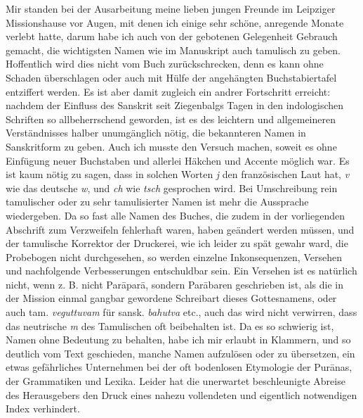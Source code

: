 \documentclass{article}
\begin{document}
Mir standen bei der Ausarbeitung meine lieben jungen Freunde im Leipziger Missionshause vor Augen, mit denen ich einige sehr schöne, anregende Monate verlebt hatte, darum habe ich auch von der gebotenen Gelegenheit Gebrauch gemacht, die wichtigsten Namen wie im Manuskript auch tamulisch zu geben. Hoffentlich wird dies nicht vom Buch zurückschrecken, denn es kann ohne Schaden überschlagen oder auch mit Hülfe der angehängten Buchstabiertafel entziffert werden. Es ist aber damit zugleich ein andrer Fortschritt erreicht: nachdem der Einfluss des Sanskrit seit Ziegenbalgs Tagen in den indologischen Schriften so allbeherrschend geworden, ist es des leichtern und allgemeineren Verständnisses halber unumgänglich nötig, die bekannteren Namen in Sanskritform zu geben. Auch ich musste den Versuch machen, soweit es ohne Einfügung neuer Buchstaben und allerlei Häkchen und Accente möglich war. Es ist kaum nötig zu sagen, dass in solchen Worten \emph{j} den französischen Laut hat, \emph{v} wie das deutsche \emph{w}, und \emph{ch} wie \emph{tsch} gesprochen wird. Bei Umschreibung rein tamulischer oder zu sehr tamulisierter Namen ist mehr die Aussprache wiedergeben. Da so fast alle Namen des Buches, die zudem in der vorliegenden Abschrift zum Verzweifeln fehlerhaft waren, haben geändert werden müssen, und der tamulische Korrektor der Druckerei, wie ich leider zu spät gewahr ward, die Probebogen nicht durchgesehen, so werden einzelne Inkonsequenzen, Versehen und nachfolgende Verbesserungen entschuldbar sein. Ein Versehen ist es natürlich nicht, wenn z. B. nicht Par\={a}par\={a}, sondern Par\={a}baren geschrieben ist, als die in der Mission einmal gangbar gewordene Schreibart dieses Gottesnamens, oder auch tam. \emph{veguttuvam} für sansk. \emph{bahutva} etc., auch das wird nicht verwirren, dass das neutrische \emph{m} des Tamulischen oft beibehalten ist. Da es so schwierig ist, Namen ohne Bedeutung zu behalten, habe ich mir erlaubt in Klammern, und so deutlich vom Text geschieden, manche Namen aufzulösen oder zu übersetzen, ein etwas gefährliches Unternehmen bei der oft bodenlosen Etymologie der Pur\={a}nas, der Grammatiken und Lexika. Leider hat die unerwartet beschleunigte Abreise des Herausgebers den Druck eines nahezu vollendeten und eigentlich notwendigen Index verhindert.
\end{document}

